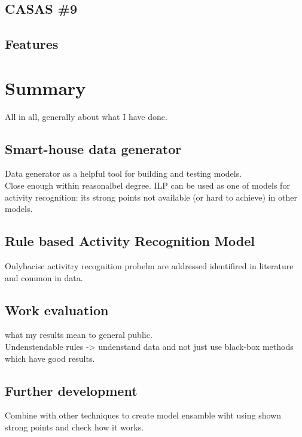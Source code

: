 \documentclass[12pt, a4paper, pdflatex, leqno, twoside, openright]{report}
\begin{document}
  \section{CASAS \#9}
  \section{Features\label{sec:multiple:features}}


\chapter{Summary\label{ch:summary}}
All in all, generally about what I have done.

  \section{Smart-house data generator}
Data generator as a helpful tool for building and testing models.\\
Close enough within reasonalbel degree. ILP can be used as one of models for activity recognition: its strong points not available (or hard to achieve) in other models.\\

  \section{Rule based Activity Recognition Model}
Onlybacisc activitry recognition probelm are addressed identifired in literature and common in data.

  \section{Work evaluation}
what my results mean to general public.\\
Undenstendable rules -> undenstand data and not just use black-box methods which have good results.

  \section{Further development}
Combine with other techniques to create model ensamble wiht using shown strong points and check how it works.
\end{document}

